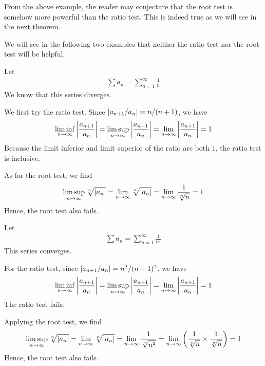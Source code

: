 \documentclass[thmcnt=section, 12pt]{my-elegantbook}
\begin{document}
From the above example, the reader may conjecture that the root test is somehow more powerful than the ratio test. This is indeed true as we will see in the next theorem.

\begin{theorem}
\end{theorem}


We will see in the following two examples that neither the ratio test nor the root test will be helpful.

\begin{example}
    Let
    \begin{align*}
        \sum a_n = \sum_{n=1}^\infty \frac{1}{n}
    \end{align*}
    We know that this series diverges. 
    
    We first try the ratio test. Since $\left\lvert  a_{n+1} / a_n  \right\rvert = n / (n+1)$, we have 
    \begin{align*}
        \liminf_{n \to \infty} \left\lvert \frac{a_{n+1}}{a_n} \right\rvert 
        = \limsup_{n \to \infty} \left\lvert \frac{a_{n+1}}{a_n} \right\rvert
        = \lim_{n \to \infty} \left\lvert \frac{a_{n+1}}{a_n} \right\rvert
        = 1
    \end{align*}
    Because the limit inferior and limit superior of the ratio are both $1$, the ratio test is inclusive.

    As for the root test, we find 
    \begin{align*}
        \limsup_{n \to \infty} \sqrt[n]{\left\lvert a_n \right\rvert}
        = \lim_{n \to \infty} \sqrt[n]{\left\lvert a_n \right\rvert}
        = \lim_{n \to \infty} \frac{1}{\sqrt[n]{n}}
        = 1
    \end{align*}
    Hence, the root test also fails.
    \label{eg:7}
\end{example}

\begin{example}
    Let
    \begin{align*}
        \sum a_n = \sum_{n=1}^\infty \frac{1}{n^2}
    \end{align*}
    This series converges.
    
    For the ratio test, since $\left\lvert  a_{n+1} / a_n  \right\rvert = n^2 / (n+1)^2$, we have 
    \begin{align*}
        \liminf_{n \to \infty} \left\lvert \frac{a_{n+1}}{a_n} \right\rvert 
        = \limsup_{n \to \infty} \left\lvert \frac{a_{n+1}}{a_n} \right\rvert
        = \lim_{n \to \infty} \left\lvert \frac{a_{n+1}}{a_n} \right\rvert
        = 1
    \end{align*}
    The ratio test fails.

    Applying the root test, we find
    \begin{align*}
        \limsup_{n \to \infty} \sqrt[n]{\left\lvert a_n \right\rvert}
        = \lim_{n \to \infty} \sqrt[n]{\left\lvert a_n \right\rvert}
        = \lim_{n \to \infty} \frac{1}{\sqrt[n]{n^2}}
        = \lim_{n \to \infty} \left( \frac{1}{\sqrt[n]{n}} \times \frac{1}{\sqrt[n]{n}} \right)
        = 1
    \end{align*}
    Hence, the root test also fails.
    \label{eg:8}
\end{example}
\end{document}
